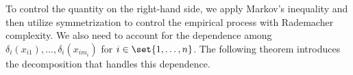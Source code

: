 \documentclass[twoside,11pt]{article}
\makeatletter
\newcommand{\discardlabel}[1]{}
\newcommand{\discardtwo}[2]{}
\newcommand{\legacyref}[1]{\textup{[source ref.]}}
\newcommand{\legacyeqref}[1]{\textup{[source equation]}}
\newenvironment{legacycomparison}{%
  \begingroup\color{legacygray}%
  \let\label\discardlabel
  \let\originallabel\discardlabel
  \let\ref\legacyref
  \let\pageref\legacyref
  \let\eqref\legacyeqref
  \let\cref\legacyref
  \let\Cref\legacyref
  \let\autoref\legacyref
  \let\aliasref\discardtwo
}{\endgroup}
\newcommand{\aliasref}[2]{%
  \@ifundefined{r@#2}{}{%
    \expandafter\let\csname r@#1\expandafter\endcsname\csname r@#2\endcsname}}
\makeatother
\begin{document}
\begin{legacycomparison}



To control the quantity on the right-hand side, we apply Markov's inequality and then utilize symmetrization to control the empirical process with Rademacher complexity. We also need to account for the dependence among $\delta_i(x_{i1}), \dots, \delta_i(x_{im_i})$ for $i \in \set{1,\dots, n}$. The following theorem introduces the decomposition that handles this dependence.


\end{legacycomparison}
\end{document}
